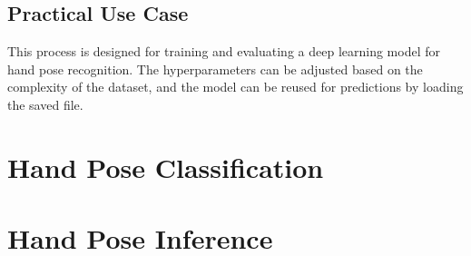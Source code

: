 \subsection*{Practical Use Case}
This process is designed for training and evaluating a deep learning model for hand pose recognition. The hyperparameters can be adjusted based on the complexity of the dataset, and the model can be reused for predictions by loading the saved file.


\section{Hand Pose Classification}



\section{Hand Pose Inference}